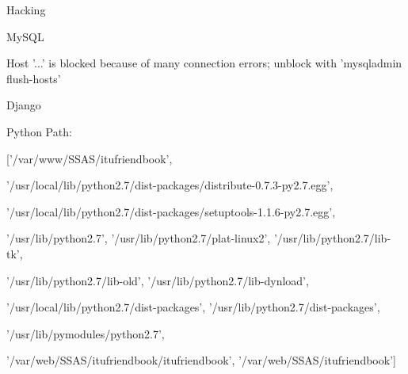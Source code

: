 \documentclass{beamer}
\begin{document}
\begin{frame}
\large
Hacking

\small
MySQL

\tiny
Host '...' is blocked because of many connection errors; 
unblock with 'mysqladmin flush-hosts'

\small
Django

\tiny
Python Path: 	

['/var/www/SSAS/itufriendbook',
 
 '/usr/local/lib/python2.7/dist-packages/distribute-0.7.3-py2.7.egg',
 
 '/usr/local/lib/python2.7/dist-packages/setuptools-1.1.6-py2.7.egg',
 
 '/usr/lib/python2.7',
 '/usr/lib/python2.7/plat-linux2',
 '/usr/lib/python2.7/lib-tk',
 
 '/usr/lib/python2.7/lib-old',
 '/usr/lib/python2.7/lib-dynload',
 
 '/usr/local/lib/python2.7/dist-packages',
 '/usr/lib/python2.7/dist-packages',
 
 '/usr/lib/pymodules/python2.7',
 
 '/var/web/SSAS/itufriendbook/itufriendbook',
 '/var/web/SSAS/itufriendbook']
 

\end{frame}
\end{document}
